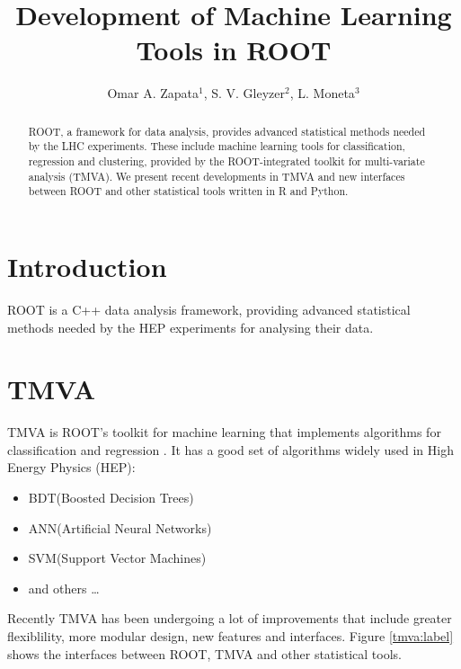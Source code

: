 \documentclass[a4paper]{jpconf}
\begin{document}
\title{Development of Machine Learning Tools in ROOT}

\author{Omar A. Zapata$^1$, S. V. Gleyzer$^2$, L. Moneta$^3$}

\address{$^1$,University of Antioquia and Metropolitan Institute of Technology.}
\address{$^2$,University of Florida and CERN.}
\address{$^3$,CERN.}


\begin{abstract}
ROOT, a framework for data analysis, provides advanced statistical methods needed by the LHC experiments.
These include machine learning tools for classification, regression and clustering, provided by the ROOT-integrated toolkit for multi-variate analysis (TMVA). 
We present recent developments in TMVA and new interfaces between ROOT and other statistical tools written in R and Python.
\end{abstract}

\section{Introduction}
ROOT  is  a C++ data analysis framework\cite{Antcheva20092499}, providing advanced statistical methods needed by the HEP experiments for analysing their data. 


\section{TMVA}
TMVA is ROOT's toolkit for machine learning that implements algorithms for
classification and regression\cite{Hocker:2007ht} .
It has a good set of algorithms widely used in High Energy Physics (HEP):
\begin{itemize}  
\item BDT(Boosted Decision Trees)
\item ANN(Artificial Neural Networks)
\item SVM(Support Vector Machines)
\item and others \ldots 
\end{itemize}
Recently TMVA has  been undergoing a lot of improvements that include greater flexiblility, more modular design, new features and interfaces.
Figure \ref{tmva:label} shows the interfaces between ROOT, TMVA and other statistical tools.
\end{document}
